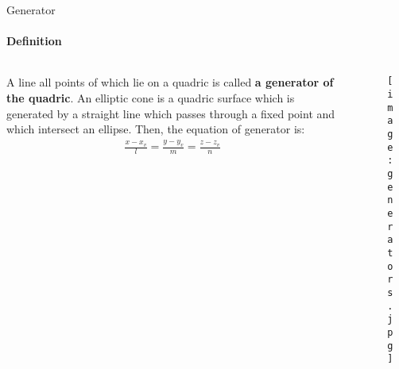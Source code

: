\documentclass[aspectratio=169]{beamer}
\begin{document}
\begin{frame}[t]{Generator}
\framesubtitle{Definition}
\begin{columns}[T,onlytextwidth]
    \begin{column}{0.49\textwidth}
        A line all points of which lie on a quadric is called \textbf{a generator of the quadric}. An elliptic cone is a quadric surface which is generated by a straight line which passes through a fixed point and which intersect an ellipse. Then, the equation of generator is:
\begin{align*}
    \frac{x-x_v}{l} = \frac{y-y_v}{m} = \frac{z-z_v}{n}
\end{align*}
    \end{column}
    \begin{column}{0.49\textwidth}
        \vspace{-0.6cm}
        \begin{figure}[H]
            \centering\texttt{[image: generators.jpg]}
            \label{fig:generators.jpg}
        \end{figure}
    \end{column}
\end{columns}

\end{frame}
\end{document}
